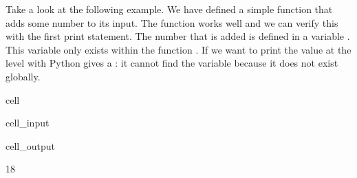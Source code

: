 \documentclass[letterpaper,10pt,english]{jupyterBook}
\begin{document}
\sphinxAtStartPar
Take a look at the following example. We have defined a simple function  that adds some number to its input. The function works well and we can verify this with the first print statement. The number that is added is defined in a  variable . This variable only exists within the function . If we want to print the value at the  level with  Python gives a : it cannot find the variable  because it does not exist globally.

\begin{sphinxuseclass}{cell}\begin{sphinxVerbatimInput}

\begin{sphinxuseclass}{cell_input}
\begin{sphinxVerbatim}[commandchars=\\\{\}]
 
      
       
    
\end{sphinxVerbatim}

\end{sphinxuseclass}\end{sphinxVerbatimInput}
\begin{sphinxVerbatimOutput}

\begin{sphinxuseclass}{cell_output}
\begin{sphinxVerbatim}[commandchars=\\\{\}]
18
\end{sphinxVerbatim}


\end{sphinxuseclass}
\end{sphinxVerbatimOutput}
\end{sphinxuseclass}
\end{document}
